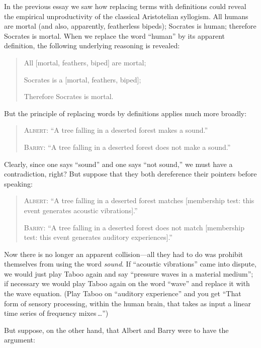 {{{
 In the previous essay we saw how replacing terms with definitions
could reveal the empirical unproductivity of the classical Aristotelian
syllogism. All humans are mortal (and also, apparently, featherless
bipeds); Socrates is human; therefore Socrates is mortal. When we
replace the word ``human'' by its
apparent definition, the following underlying reasoning is revealed:}

\begin{quotation}
{
 All [mortal, {\textlnot}feathers, biped] are mortal;}

{
 Socrates is a [mortal, {\textlnot}feathers, biped];}

{
  Therefore Socrates is mortal.}
\end{quotation}

{
 But the principle of replacing words by definitions applies much
more broadly:}

\begin{quotation}
{
 \textsc{Albert}: ``A tree falling in a deserted forest
makes a sound.''}

{
 \textsc{Barry}: ``A tree falling in a deserted forest does
 not make a sound.''}
\end{quotation}

{
 Clearly, since one says
``sound'' and one says
``not sound,'' we must have a
contradiction, right? But suppose that they both dereference their
pointers before speaking:}

\begin{quotation}
{
 \textsc{Albert}: ``A tree falling in a deserted forest
matches [membership test: this event generates acoustic
vibrations].''}

{
 \textsc{Barry}: ``A tree falling in a deserted forest does
not match [membership test: this event generates auditory
  experiences].''}
\end{quotation}

{
 Now there is no longer an apparent collision---all they had to do
was prohibit themselves from using the word \textit{sound}. If
``acoustic vibrations'' came into
dispute, we would just play Taboo again and say
``pressure waves in a material
medium''; if necessary we would play Taboo again on
the word ``wave'' and replace it
with the wave equation. (Play Taboo on ``auditory
experience'' and you get ``That form
of sensory processing, within the human brain, that takes as input a
linear time series of frequency mixes\,\ldots'')}

{
 But suppose, on the other hand, that Albert and Barry were to have
the argument:}

}}
